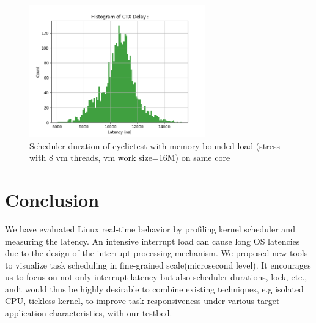 \documentclass[conference]{IEEEtran}
\begin{document}
    \begin{figure} \centering \includegraphics[width=3in]{img/sd-same-no-cache.png} \caption{Scheduler duration of
    cyclictest with memory bounded load (stress with 8 vm threads, vm work size=16M) on same core} \label{fig:sd_same_no_cache} \end{figure}

\section{Conclusion}
    We have evaluated Linux real-time behavior by profiling kernel scheduler and measuring the latency.
    An intensive interrupt load can cause long OS latencies due to the design of the interrupt
    processing mechanism. We proposed new tools to visualize task scheduling in fine-grained scale(microsecond level).
    It encourages us to focus on not only interrupt latency but also scheduler durations, lock, etc., andt would thus
    be highly desirable to combine existing techniques, e.g isolated CPU, tickless kernel, to improve task responsiveness
    under various target application characteristics, with our testbed.



\end{document}
